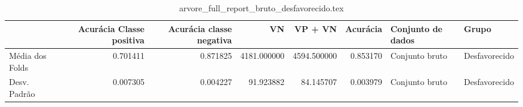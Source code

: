 \begin{table}
\centering
\caption{arvore_full_report_bruto_desfavorecido.tex}
\label{arvore_full_report_bruto_desfavorecido.tex}
\begin{tabular}{lrrrrrll}
\toprule
{}              &  Acurácia Classe positiva &  Acurácia classe negativa &          VN  &     VP + VN  &  Acurácia & Conjunto de dados &          Grupo \\
\midrule
Média dos Folds &                  0.701411 &                  0.871825 &  4181.000000 &  4594.500000 &  0.853170 &    Conjunto bruto &  Desfavorecido \\
Desv. Padrão    &                  0.007305 &                  0.004227 &    91.923882 &    84.145707 &  0.003979 &    Conjunto bruto &  Desfavorecido \\
\bottomrule
\end{tabular}
\end{table}
